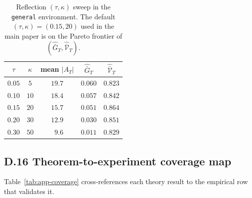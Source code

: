 \documentclass{article} %
\begin{document}
\begin{table}[h]
\centering
\small
\begin{tabular}{ccccc}
\toprule
$\tau$ & $\kappa$ & mean $|A_T|$ & $\widehat{\bar G}_T$ & $\widehat{\bar{\mathcal V}}_T$ \\
\midrule
$0.05$ & $5$  & $19.7$ & $0.060$ & $0.823$ \\
$0.10$ & $10$ & $18.4$ & $0.057$ & $0.842$ \\
$0.15$ & $20$ & $15.7$ & $0.051$ & $0.864$ \\
$0.20$ & $30$ & $12.9$ & $0.030$ & $0.851$ \\
$0.30$ & $50$ & $\phantom{0}9.6$ & $0.011$ & $0.829$ \\
\bottomrule
\end{tabular}
\caption{Reflection $(\tau,\kappa)$ sweep in the \texttt{general} environment. The default $(\tau,\kappa)=(0.15,20)$ used in the main paper is on the Pareto frontier of $(\widehat{\bar G}_T, \widehat{\bar{\mathcal V}}_T)$.}
\label{tab:app-reflect-sweep}
\end{table}

\subsection{D.16 Theorem-to-experiment coverage map}

\label{app:tab-coverage}

Table~\ref{tab:app-coverage} cross-references each theory result to the empirical row that validates it.
\end{document}
